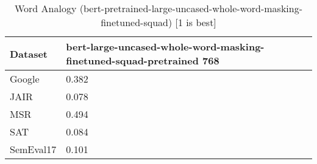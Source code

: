 \begin{table}[]
\centering
\begin{tabular}{l|l}
\hline
Dataset & bert-large-uncased-whole-word-masking-finetuned-squad-pretrained 768 \\
\hline
Google & 0.382 \\ 
JAIR & 0.078 \\ 
MSR & 0.494 \\ 
SAT & 0.084 \\ 
SemEval17 & 0.101
\end{tabular}
\caption{Word Analogy (bert-pretrained-large-uncased-whole-word-masking-finetuned-squad) [1 is best]}
\label{tab:analogy-bert-pretrained-large-uncased-whole-word-masking-finetuned-squad}
\end{table}
